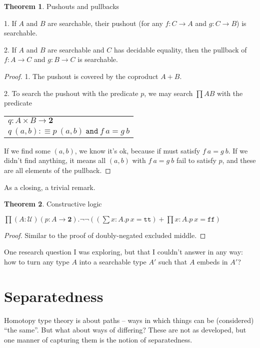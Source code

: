 \documentclass[11pt]{article}
\theoremstyle{definition}
\newtheorem{theorem}{Theorem}[section]
\newcommand{\txt}[1]{\texttt{#1}}
\renewcommand{\(}{\left(}
\renewcommand{\)}{\right)}
\newcommand{\defn}{:\equiv}
\newcommand{\U}{\mathcal{U}}
\newcommand{\apl}[2]{#1\ #2}
\newcommand{\Bool}{\mathbf{2}}
\newcommand{\true}{\txt{tt}}
\newcommand{\false}{\txt{ff}}
\newcommand{\dprod}[2]{\prod #1.#2}
\newcommand{\dsum}[2]{\sum #1.#2}
\newcommand{\prodt}[2]{#1 \times #2}
\begin{document}
\begin{theorem} Pushouts and pullbacks

1. If $A$ and $B$ are searchable, their pushout (for any $f : C \to A$ and $g : C \to B$) is searchable.

2. If $A$ and $B$ are searchable and $C$ has decidable equality, then the pullback of $f: A \to C$ and $g : B \to C$ is searchable.
\end{theorem}
\begin{proof}

1. The pushout is covered by the coproduct $A + B$.

2. To search the pushout with the predicate $p$, we may search $\prod{A}{B}$ with the predicate

\begin{center}
\begin{tabular}{l}
$q : \prodt{A}{B} \to \Bool$ \\
$\apl{q}{(a, b)} \defn \apl{p}{(a, b)}\ \txt{and}\ \apl{f}{a} = \apl{g}{b}$
\end{tabular}
\end{center}

If we find some $(a, b)$, we know it's ok, because if must satisfy $\apl{f}{a} = \apl{g}{b}$. If we didn't find anything, it means all $(a, b)$ with $\apl{f}{a} = \apl{g}{b}$ fail to satisfy $p$, and these are all elements of the pullback.

\end{proof}

As a closing, a trivial remark.

\begin{theorem} Constructive logic

$\dprod{(A : \U)(p : A \to \Bool)}{\neg\neg \(\(\dsum{x : A}{\apl{p}{x} = \true}\) + \dprod{x : A}{\apl{p}{x} = \false}\)}$

\end{theorem}
\begin{proof}
Similar to the proof of doubly-negated excluded middle.
\end{proof}

One research question I was exploring, but that I couldn't answer in any way: how to turn any type $A$ into a searchable type $A'$ such that $A$ embeds in $A'$?

\section{Separatedness}

Homotopy type theory is about paths -- ways in which things can be (considered) ``the same''. But what about ways of differing? These are not as developed, but one manner of capturing them is the notion of separatedness.
\end{document}
